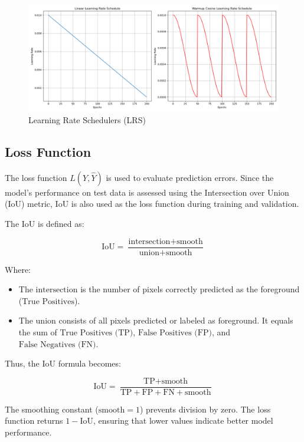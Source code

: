 \begin{figure}[H]
    \centering
    \includegraphics[width=0.9\linewidth]{PICTURES/LRS.png}
    \caption{Learning Rate Schedulers (LRS)}
    \label{fig:LRS}
\end{figure}
\subsection{Loss Function}\label{IoU}

The loss function \( L(Y, \hat{Y}) \) is used to evaluate prediction errors. Since the model's performance on test data is assessed using the Intersection over Union (IoU) metric, IoU is also used as the loss function during training and validation.

The IoU is defined as:

\begin{equation}
\text{IoU} = \frac{\text{intersection} + \text{smooth}}{\text{union} + \text{smooth}}
\label{eq:iou}
\end{equation}


Where:
\begin{itemize}
    \item The \( \text{intersection} \) is the number of pixels correctly predicted as the foreground (\(\text{True Positives}\)).
    \item The \( \text{union} \) consists of all pixels predicted or labeled as foreground. It equals the sum of \( \text{True Positives (TP)} \), \( \text{False Positives (FP)} \), and \( \text{False Negatives (FN)} \).
\end{itemize}

Thus, the IoU formula becomes:

\begin{equation}
\text{IoU} = \frac{\text{TP} + \text{smooth}}{\text{TP} + \text{FP} + \text{FN} + \text{smooth}}
\label{eq:iou_smooth}
\end{equation}


The smoothing constant (\(\text{smooth} = 1\)) prevents division by zero. The loss function returns \( 1 - \text{IoU} \), ensuring that lower values indicate better model performance.

